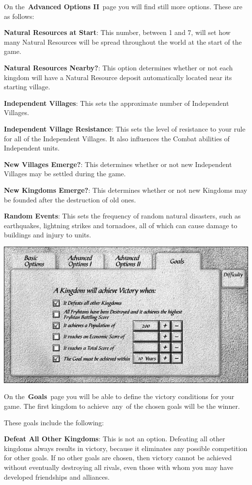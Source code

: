 On the \textbf{Advanced Options II} page you will find still more options.  These are as follows:

\textbf{Natural Resources at Start}: This number, between 1 and 7, will set how many Natural Resources will be spread throughout the world at the start of the game.

\textbf{Natural Resources Nearby?}: This option determines whether or not each kingdom will have a Natural Resource deposit automatically located near its starting village.

\textbf{Independent Villages}: This sets the approximate number of Independent Villages.

\textbf{Independent Village Resistance}: This sets the level of resistance to your rule for all of the Independent Villages. It also influences the Combat abilities of Independent units.

\textbf{New Villages Emerge?}: This determines whether or not new Independent Villages may be settled during the game.

\textbf{New Kingdoms Emerge?}: This determines whether or not new Kingdoms may be founded after the destruction of old ones.

\textbf{Random Events}: This sets the frequency of random natural disasters, such as earthquakes, lightning strikes and tornadoes, all of which can cause damage to buildings and injury to units.

\begin{center}
	\includegraphics[width=0.7\linewidth]{Igoals}
\end{center}

On the \textbf{Goals} page you will be able to define the victory conditions for your game. The first kingdom to achieve any of the chosen goals will be the winner.

These goals include the following:

\textbf{Defeat All Other Kingdoms}: This is not an option. Defeating all other kingdoms always results in victory, because it eliminates any possible competition for other goals. If no other goals are chosen, then victory cannot be achieved without eventually destroying all rivals, even those with whom you may have developed friendships and alliances.

